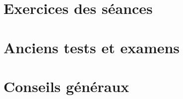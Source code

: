 

\chapter{Exercices des séances}


\chapter{Anciens tests et examens}



\chapter{Conseils généraux}

